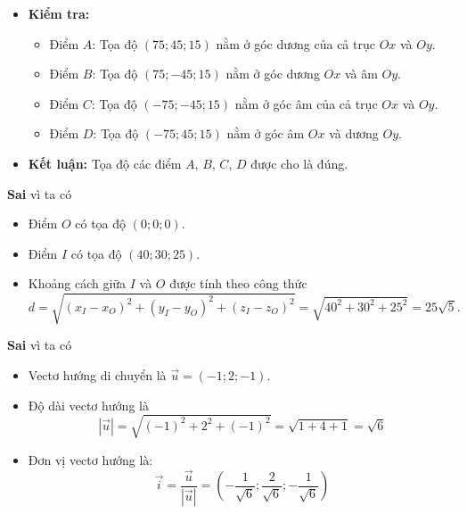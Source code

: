 \begin{ex}
{\begin{itemchoice}
\begin{itemize}
\begin{itemize}
 					\item Các flycam được đặt cách đều mặt đất $30$ m. Thiết bị điều khiển trung tâm $O$ cách mặt đất $15$ m, do đó điểm $O$ có tọa độ $(0;0;0)$ trong hệ trục này (vì chiều $Oz$ dương hướng lên trên).
 					\item Các điểm $A$, $B$, $C$, $D$ nằm trên các đường thẳng vuông góc với sân vận động tại các góc, cách mặt đất $30$ m, nên tọa độ của chúng sẽ có hoành độ và tung độ tương ứng với các góc của sân và hoành độ $z = 15$ (vì $O$ cách mặt đất $15$ m, và flycam cách $30$ m mặt đất nên $z = 15$).
 				\end{itemize}
 				\item \textbf{Kiểm tra:}
 				\begin{itemize}
 					\item Điểm $A$: Tọa độ $(75; 45; 15)$ nằm ở góc dương của cả trục $Ox$ và $Oy$.
 					\item Điểm $B$: Tọa độ $(75; -45; 15)$ nằm ở góc dương $Ox$ và âm $Oy$.
 					\item Điểm $C$: Tọa độ $(-75; -45; 15)$ nằm ở góc âm của cả trục $Ox$ và $Oy$.
 					\item Điểm $D$: Tọa độ $(-75; 45; 15)$ nằm ở góc âm $Ox$ và dương $Oy$.
 				\end{itemize}
 				\item \textbf{Kết luận:} Tọa độ các điểm $A$, $B$, $C$, $D$ được cho là đúng.
 			\end{itemize}
 			\itemch \textbf{Sai} vì ta có
 			\begin{itemize}
 				\item Điểm $O$ có tọa độ $(0;0;0)$.
 				\item Điểm $I$ có tọa độ $(40;30;25)$.
 				\item Khoảng cách giữa $I$ và $O$ được tính theo công thức
 				$$
 				d = \sqrt{(x_I - x_O)^2 + (y_I - y_O)^2 + (z_I - z_O)^2} = \sqrt{40^2 + 30^2 + 25^2}=25\sqrt{5}.
 				$$
 			\end{itemize}
 			\itemch \textbf{Sai} vì ta có
 			\begin{itemize}
 				\item Vectơ hướng di chuyển là $\overrightarrow{u} = (-1;2;-1)$.
 				\item Độ dài vectơ hướng là
 				$$
 				\left|\overrightarrow{u}\right| = \sqrt{(-1)^2 + 2^2 + (-1)^2} = \sqrt{1 + 4 + 1} = \sqrt{6}
 				$$
 				\item Đơn vị vectơ hướng là:
 				$$
 				\overrightarrow{i} =\dfrac{\overrightarrow{u}}{\left|\overrightarrow{u}\right|}= \left( -\dfrac{1}{\sqrt{6}} ; \dfrac{2}{\sqrt{6}} ; -\dfrac{1}{\sqrt{6}} \right)
$$
\end{itemize}
\end{itemchoice}}
\end{ex}
